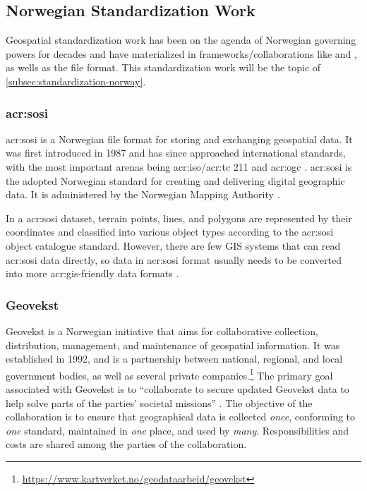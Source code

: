 \subsection{Norwegian Standardization Work}\label{subsec:standardization-norway}

Geospatial standardization work has been on the agenda of Norwegian governing powers for decades and have materialized in frameworks/collaborations like  and , as wells as the  file format. This standardization work will be the topic of \autoref{subsec:standardization-norway}.

\subsubsection[SOSI]{\acrshort{acr:sosi}}\label{subsubsec:sosi}

\gls{acr:sosi} is a Norwegian file format for storing and exchanging geospatial data. It was first introduced in 1987 and has since approached international standards, with the most important arenas being \acrshort{acr:iso}/\acrshort{acr:tc} 211 and \gls{acr:ogc} \citep{mardalNasjonalStrategiVidereutvikling2015}. \gls{acr:sosi} is the adopted Norwegian standard for creating and delivering digital geographic data. It is administered by the Norwegian Mapping Authority \citep{maehlumSOSI2023}.


In a \gls{acr:sosi} dataset, terrain points, lines, and polygons are represented by their coordinates and classified into various object types according to the \gls{acr:sosi} object catalogue standard. However, there are few GIS systems that can read \gls{acr:sosi} data directly, so data in \gls{acr:sosi} format usually needs to be converted into more \gls{acr:gis}-friendly data formats \citep{maehlumSOSI2023}.

\subsubsection{Geovekst}\label{subsubsec:geovekst}

Geovekst is a Norwegian initiative that aims for collaborative collection, distribution, management, and maintenance of geospatial information. It was established in 1992, and is a partnership between national, regional, and local government bodies, as well as several private companies.\footnote{\url{https://www.kartverket.no/geodataarbeid/geovekst}} The primary goal associated with Geovekst is to \enquote{collaborate to secure updated Geovekst data to help solve parts of the parties' societal missions} \citep[5]{thenorwegianmappingauthorityHandbokGeovekstsamarbeidet2023}. The objective of the collaboration is to ensure that geographical data is collected \textit{once}, conforming  to \textit{one} standard, maintained in \textit{one} place, and used by \textit{many}. Responsibilities and costs are shared among the parties of the collaboration.

